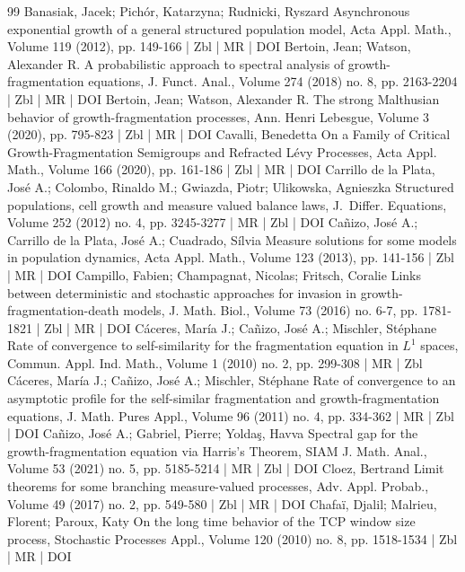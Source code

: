 \begin{thebibliography}{99}
Banasiak, Jacek; Pichór, Katarzyna; Rudnicki, Ryszard Asynchronous exponential growth of a general structured population model, Acta Appl. Math., Volume 119 (2012), pp. 149-166 | Zbl | MR | DOI
Bertoin, Jean; Watson, Alexander R. A probabilistic approach to spectral analysis of growth-fragmentation equations, J. Funct. Anal., Volume 274 (2018) no. 8, pp. 2163-2204 | Zbl | MR | DOI
Bertoin, Jean; Watson, Alexander R. The strong Malthusian behavior of growth-fragmentation processes, Ann. Henri Lebesgue, Volume 3 (2020), pp. 795-823 | Zbl | MR | DOI
Cavalli, Benedetta On a Family of Critical Growth-Fragmentation Semigroups and Refracted Lévy Processes, Acta Appl. Math., Volume 166 (2020), pp. 161-186 | Zbl | MR | DOI
Carrillo de la Plata, José A.; Colombo, Rinaldo M.; Gwiazda, Piotr; Ulikowska, Agnieszka Structured populations, cell growth and measure valued balance laws, J. Differ. Equations, Volume 252 (2012) no. 4, pp. 3245-3277 | MR | Zbl | DOI
Cañizo, José A.; Carrillo de la Plata, José A.; Cuadrado, Sílvia Measure solutions for some models in population dynamics, Acta Appl. Math., Volume 123 (2013), pp. 141-156 | Zbl | MR | DOI
Campillo, Fabien; Champagnat, Nicolas; Fritsch, Coralie Links between deterministic and stochastic approaches for invasion in growth-fragmentation-death models, J. Math. Biol., Volume 73 (2016) no. 6-7, pp. 1781-1821 | Zbl | MR | DOI
Cáceres, María J.; Cañizo, José A.; Mischler, Stéphane Rate of convergence to self-similarity for the fragmentation equation in ${L}^1$ spaces, Commun. Appl. Ind. Math., Volume 1 (2010) no. 2, pp. 299-308 | MR | Zbl
Cáceres, María J.; Cañizo, José A.; Mischler, Stéphane Rate of convergence to an asymptotic profile for the self-similar fragmentation and growth-fragmentation equations, J. Math. Pures Appl., Volume 96 (2011) no. 4, pp. 334-362 | MR | Zbl | DOI
Cañizo, José A.; Gabriel, Pierre; Yoldaş, Havva Spectral gap for the growth-fragmentation equation via Harris’s Theorem, SIAM J. Math. Anal., Volume 53 (2021) no. 5, pp. 5185-5214 | MR | Zbl | DOI
Cloez, Bertrand Limit theorems for some branching measure-valued processes, Adv. Appl. Probab., Volume 49 (2017) no. 2, pp. 549-580 | Zbl | MR | DOI
Chafaï, Djalil; Malrieu, Florent; Paroux, Katy On the long time behavior of the TCP window size process, Stochastic Processes Appl., Volume 120 (2010) no. 8, pp. 1518-1534 | Zbl | MR | DOI

\end{thebibliography}
